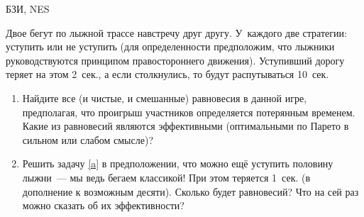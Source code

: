 \begin{problem}[Лыжники.]
\begin{source}
БЗИ, NES
\end{source} Двое бегут по лыжной
трассе навстречу друг другу. У~каждого две стратегии:
уступить или не уступить (для определенности предположим,
что лыжники руководствуются принципом правостороннего
движения). Уступивший дорогу теряет на этом 2~сек., а если
столкнулись, то будут распутываться 10~сек.

\begin{enumerate}

\item\label{a} Найдите все (и чистые, и смешанные)
равновесия в данной игре, предполагая, что проигрыш
участников определяется потерянным временем. Какие из
равновесий являются эффективными (оптимальными по Парето в
сильном или слабом смысле)?

\item Решить задачу \ref{a} в предположении, что можно ещё
уступить половину лыжни~— мы ведь бегаем классикой! При
этом теряется 1~сек. (в дополнение к возможным десяти).
Сколько будет равновесий? Что на сей раз можно сказать об
их эффективности?

\end{enumerate}
\begin{sol}

\end{sol}
\end{problem}





